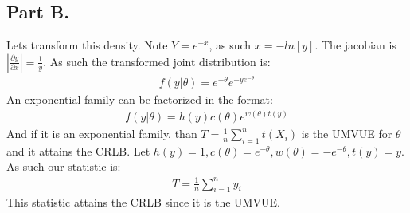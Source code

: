 \documentclass{article}
\begin{document}
\subsection*{Part B.}
Lets transform this density. Note $Y=e^{-x}$, as such $x = -ln [y]$. The jacobian is $|\frac{\partial y}{\partial x}|=\frac{1}{y}$. As such the transformed joint distribution is:
\begin{align*}
f(y|\theta) = e^{-\theta} e^{-y e^{-\theta}}
\end{align*}
An exponential family can be factorized in the format:
\begin{align*}
f(y|\theta) = h(y)c(\theta) e^{w(\theta) t(y)}
\end{align*}
And if it is an exponential family, than $T=\frac{1}{n} \sum_{i=1}^{n} t(X_i) $ is the UMVUE for $\theta$ and it attains the CRLB. Let $h(y)=1, c(\theta) = e^{-\theta}, w(\theta)= -e^{-\theta}, t(y) = y$. As such our statistic is:
\begin{align*}
T = \frac{1}{n} \sum_{i=1}^{n} y_i
\end{align*}
This statistic attains the CRLB since it is the UMVUE.
\end{document}
